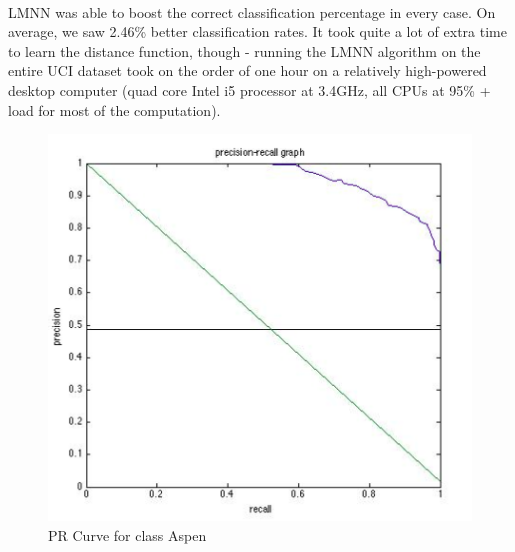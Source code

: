 \documentclass[11pt]{article}
\begin{document}
    \paragraph{}
    LMNN was able to boost the correct classification percentage in every case. On average, we saw 2.46\% better classification rates. It took quite a lot of extra time to learn the distance function, though - running the LMNN algorithm on the entire UCI dataset took on the order of one hour on a relatively high-powered desktop computer (quad core Intel i5 processor at 3.4GHz, all CPUs at 95\% + load for most of the computation).
     
     
     
     
    \begin{figure}[htbp]
    \begin{minipage}[b]{\linewidth}
    \centering
    \includegraphics[width=\linewidth]{images/AspenPRCurve.png}
    \caption{PR Curve for class Aspen}
    \label{fig:chapter001_dist_001}
    \end{minipage}
    \end{figure}
    \hspace{0.5cm}
\end{document}
